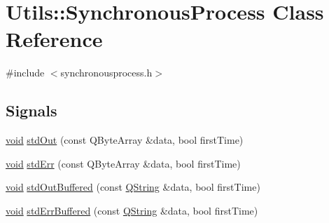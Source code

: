 \hypertarget{class_utils_1_1_synchronous_process}{\section{\-Utils\-:\-:\-Synchronous\-Process \-Class \-Reference}
\label{class_utils_1_1_synchronous_process}
}


{\ttfamily \#include $<$synchronousprocess.\-h$>$}

\subsection*{\-Signals}
\begin{DoxyCompactItemize}
\item 
\hyperlink{group___u_a_v_objects_plugin_ga444cf2ff3f0ecbe028adce838d373f5c}{void} \hyperlink{class_utils_1_1_synchronous_process_a028c3f124eda0ff36f4b3a2646356dc2}{std\-Out} (const \-Q\-Byte\-Array \&data, bool first\-Time)
\item 
\hyperlink{group___u_a_v_objects_plugin_ga444cf2ff3f0ecbe028adce838d373f5c}{void} \hyperlink{class_utils_1_1_synchronous_process_ac385711ccc6eba25bab089c0e41bc52f}{std\-Err} (const \-Q\-Byte\-Array \&data, bool first\-Time)
\item 
\hyperlink{group___u_a_v_objects_plugin_ga444cf2ff3f0ecbe028adce838d373f5c}{void} \hyperlink{class_utils_1_1_synchronous_process_a2508ede68c740f8b3565609dbd5c0782}{std\-Out\-Buffered} (const \hyperlink{group___u_a_v_objects_plugin_gab9d252f49c333c94a72f97ce3105a32d}{\-Q\-String} \&data, bool first\-Time)
\item 
\hyperlink{group___u_a_v_objects_plugin_ga444cf2ff3f0ecbe028adce838d373f5c}{void} \hyperlink{class_utils_1_1_synchronous_process_a2534bbff80651365f5554772a57838dc}{std\-Err\-Buffered} (const \hyperlink{group___u_a_v_objects_plugin_gab9d252f49c333c94a72f97ce3105a32d}{\-Q\-String} \&data, bool first\-Time)
\end{DoxyCompactItemize}

